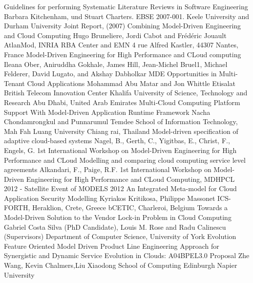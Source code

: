 \documentclass{llncs}
\begin{document}
\begin{thebibliography}{1}
Guidelines for performing Systematic Literature Reviews in Software Engineering
Barbara Kitchenham, und Stuart Charters. EBSE 2007-001. Keele University and Durham University Joint Report, (2007)
Combining Model-Driven Engineering and Cloud Computing
Hugo Bruneliere, Jordi Cabot and Frédéric Jouault AtlanMod, INRIA RBA Center and EMN
4 rue Alfred Kastler, 44307 Nantes, France
\bibitem{}
Model-Driven Engineering for High Performance and CLoud computing
Ileana Ober, Aniruddha Gokhale, James Hill, Jean-Michel Bruel1, Michael Felderer, David Lugato, and Akshay Dabholkar
\bibitem{}
MDE Opportunities in Multi-Tenant Cloud Applications
Mohammad Abu Matar and Jon Whittle
Etisalat British Telecom Innovation Center Khalifa University of Science, Technology and Research Abu Dhabi, United Arab Emirates
\bibitem{}
Multi‐Cloud Computing Platform Support
With Model‐Driven Application Runtime Framework
Nacha Chondamrongkul and Punnarumul Temdee
School of Information Technology, Mah Fah Luang University Chiang rai, Thailand
\bibitem{}
Model-driven specification of adaptive cloud-based systems
Nagel, B., Gerth, C., Yigitbas, E., Christ, F., Engels, G.
 1st International Workshop on Model-Driven Engineering for High Performance and CLoud
\bibitem{}
Modelling and comparing cloud computing service level agreements
Alkandari, F., Paige, R.F.
 1st International Workshop on Model-Driven Engineering for High Performance and CLoud
Computing, MDHPCL 2012 - Satellite Event of MODELS 2012
\bibitem{}
An Integrated Meta-model for Cloud Application Security Modelling
Kyriakos Kritikosa, Philippe Massonet
ICS-FORTH, Heraklion, Crete, Greece bCETIC, Charleroi, Belgium
\bibitem{}
Towards a Model-Driven Solution to the Vendor Lock-in Problem in Cloud Computing
Gabriel Costa Silva (PhD Candidate), Louis M. Rose and Radu Calinescu (Supervisors)
Department of Computer Science, University of York
\bibitem{}
Evolution Feature Oriented Model Driven
Product Line Engineering Approach for Synergistic and Dynamic Service
Evolution in Clouds: A04BPEL3.0 Proposal
Zhe Wang, Kevin Chalmers,Liu Xiaodong
School of Computing Edinburgh Napier University
\end{thebibliography}
\end{document}
